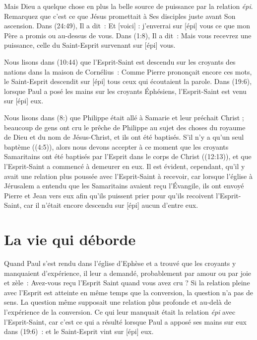 Mais Dieu a quelque chose en plus \ocadr la belle source de puissance
 par la relation \emph{épi}.
 Remarquez que c'est ce que Jésus promettait à Ses disciples juste avant
 Son ascension. Dans (24:49), Il a dit~:
 \og Et [voici] : j'enverrai sur [épi] vous ce que mon Père a promis \fg{} ou
 \og au-dessus de vous. \fg{}
 Dans (1:8), Il a dit~:
 \og Mais vous recevrez une puissance, celle du Saint-Esprit survenant
 sur [épi] vous. \fg{}

Nous lisons dans (10:44) que l'Esprit-Saint est descendu
 \og sur \fg{} les croyants des nations dans la maison de Cornélius~:
 \og Comme Pierre prononçait encore ces mots, le Saint-Esprit descendit
 sur [épi] tous ceux qui écoutaient la parole. \fg{}
 Dans (19:6), lorsque Paul a posé les mains sur les
 croyants Éphésiens, l'Esprit-Saint est venu sur [épi] eux.

Nous lisons dans (8:) que Philippe était allé à Samarie
 et leur préchait Christ ; beaucoup de gens ont cru le prêche de Philippe
 au sujet des choses du royaume de Dieu et du nom de Jésus-Christ,
 et ils ont été baptisés.
 S'il n'y a qu'un seul baptème ((4:5)),
 alors nous devons accepter à ce moment que les croyants Samaritains
 ont été baptisés par l'Esprit dans le corps de Christ
 ((12:13)), et que l'Esprit-Saint a commencé à demeurer
 en eux. Il est évident, cependant, qu'il y avait une relation plus poussée
 avec l'Esprit-Saint à recevoir, car lorsque l'église à Jérusalem a entendu
 que les Samaritains avaient reçu l'Évangile, ils ont envoyé Pierre et Jean
 vers eux afin qu'ils puissent prier pour qu'ils recoivent l'Esprit-Saint,
 car il n'était encore descendu sur [épi] aucun d'entre eux.

\section*{La vie qui déborde}

Quand Paul s'est rendu dans l'église d'Ephèse et a trouvé que les croyants
 y manquaient d'expérience, il leur a demandé, probablement par amour
 ou par joie et zèle~: \og Avez-vous reçu l'Esprit Saint
 quand vous avez cru ? \fg{}
 Si la relation pleine avec l'Esprit est atteinte en même temps
 que la conversion, la question n'a pas de sens.
 La question même supposait une relation plus profonde et au-delà
 de l'expérience de la conversion. Ce qui leur manquait était la relation
 \emph{épi} avec l'Es\-prit-Saint, car c'est ce qui a résulté lorsque
 Paul a apposé ses mains sur eux dans (19:6)~:
 \og et le Saint-Esprit vint sur [épi] eux. \fg{}

